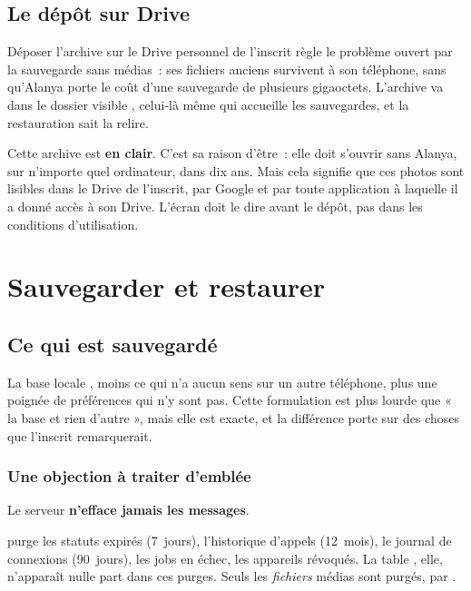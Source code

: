 \documentclass[11pt,a4paper,oneside]{report}
\begin{document}
\section{Le dépôt sur Drive}

Déposer l'archive sur le Drive personnel de l'inscrit règle le problème ouvert par la
sauvegarde sans médias~: ses fichiers anciens survivent à son téléphone, sans qu'Alanya
porte le coût d'une sauvegarde de plusieurs gigaoctets. L'archive va dans le dossier
visible , celui-là même qui accueille les sauvegardes, et la restauration
sait la relire.

\begin{alerte}
Cette archive est \textbf{en clair}. C'est sa raison d'être~: elle doit s'ouvrir sans
Alanya, sur n'importe quel ordinateur, dans dix ans. Mais cela signifie que ces photos sont
lisibles dans le Drive de l'inscrit, par Google et par toute application à laquelle il a
donné accès à son Drive. L'écran doit le dire avant le dépôt, pas dans les conditions
d'utilisation.
\end{alerte}

\chapter{Sauvegarder et restaurer}
\label{ch:sauvegarde-vue}

\section{Ce qui est sauvegardé}

La base locale , moins ce qui n'a aucun sens sur un autre téléphone,
plus une poignée de préférences qui n'y sont pas. Cette formulation est plus lourde que
« la base et rien d'autre », mais elle est exacte, et la différence porte sur des choses que
l'inscrit remarquerait.

\subsection*{Une objection à traiter d'emblée}

Le serveur \textbf{n'efface jamais les messages}.

\begin{constat}
 purge les statuts expirés (7~jours), l'historique d'appels
(12~mois), le journal de connexions (90~jours), les jobs en échec, les appareils révoqués.
La table , elle, n'apparaît nulle part dans ces purges. Seuls les
\emph{fichiers} médias sont purgés, par .
\end{constat}
\end{document}
